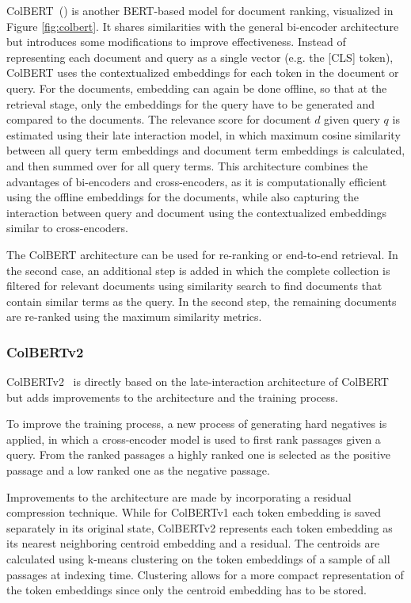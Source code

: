 ColBERT~(\cite{khattab:2020:Colbert}) is another BERT-based model for document ranking, visualized in Figure \ref{fig:colbert}.
It shares similarities with the general bi-encoder architecture but introduces some modifications to improve effectiveness.
Instead of representing each document and query as a single vector (e.g. the [CLS] token), ColBERT uses the contextualized embeddings for each token in the document or query.
For the documents, embedding can again be done offline, so that at the retrieval stage, only the embeddings for the query have to be generated and compared to the documents.
The relevance score for document $d$ given query $q$ is estimated using their late interaction model, in which maximum cosine similarity between all query term embeddings and document term embeddings is calculated, and then summed over for all query terms.
This architecture combines the advantages of bi-encoders and cross-encoders, as it is computationally efficient using the offline embeddings for the documents, while also capturing the interaction between query and document using the contextualized embeddings similar to cross-encoders.

The ColBERT architecture can be used for re-ranking or end-to-end retrieval.
In the second case, an additional step is added in which the complete collection is filtered for relevant documents using similarity search to find documents that contain similar terms as the query.
In the second step, the remaining documents are re-ranked using the maximum similarity metrics.

\subsubsection{ColBERTv2}\label{sec:colbertv2}
ColBERTv2~\citep{santhanam:2021:Colbertv2} is directly based on the late-interaction architecture of ColBERT but adds improvements to the architecture and the training process.

To improve the training process, a new process of generating hard negatives is applied, in which a cross-encoder model is used to first rank passages given a query.
From the ranked passages a highly ranked one is selected as the positive passage and a low ranked one as the negative passage.

Improvements to the architecture are made by incorporating a residual compression technique.
While for ColBERTv1 each token embedding is saved separately in its original state, ColBERTv2 represents each token embedding as its nearest neighboring centroid embedding and a residual.
The centroids are calculated using k-means clustering on the token embeddings of a sample of all passages at indexing time. 
Clustering allows for a more compact representation of the token embeddings since only the centroid embedding has to be stored.

